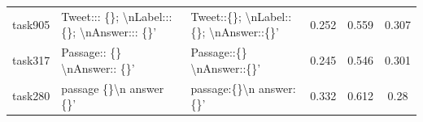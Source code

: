 \documentclass{article} %
\begin{document}
\begin{table}[h]
\begin{tabular}{@{}cp{4.2cm\ttfamily\tiny}p{4.2cm\ttfamily\tiny}ccc@{}}
task905    & Tweet::: \{\}; \textbackslash{}nLabel::: \{\}; \textbackslash{}nAnswer::: \{\}'                                                                                                                                                                                                                                                                                                                                      & Tweet::\{\}; \textbackslash{}nLabel::\{\}; \textbackslash{}nAnswer::\{\}'                                                                                                                                                                                                                                                                                                                                           & 0.252  & 0.559  & 0.307     \\
task317    & Passage:: \{\} \textbackslash{}nAnswer:: \{\}'                                                                                                                                                                                                                                                                                                                                                                       & Passage::\{\} \textbackslash{}nAnswer::\{\}'                                                                                                                                                                                                                                                                                                                                                                        & 0.245  & 0.546  & 0.301     \\
task280    & passage \{\}\textbackslash{}n answer \{\}'                                                                                                                                                                                                                                                                                                                                                                           & passage:\{\}\textbackslash{}n answer:\{\}'                                                                                                                                                                                                                                                                                                                                                                          & 0.332  & 0.612  & 0.28      \\

\end{tabular}
\end{table}
\end{document}
